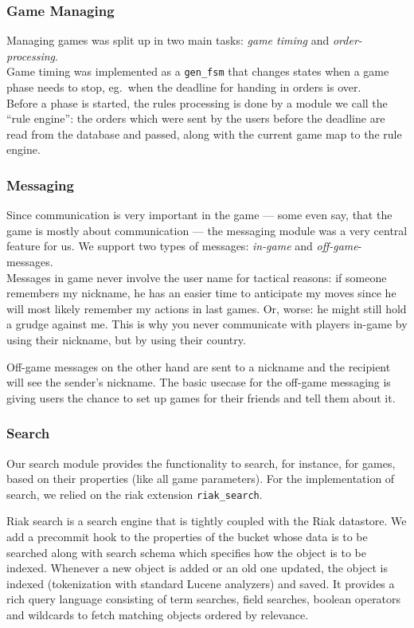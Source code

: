 \documentclass[11pt,a4paper]{report}
\begin{document}
\subsubsection{Game Managing}
Managing games was split up in two main tasks: {\em game timing\/} and
{\em order-processing}. \\
Game timing was implemented as a {\tt gen\_fsm} that changes states when a game
phase needs to stop, eg.\ when the deadline for handing in orders is over.\\
Before a phase is started, the rules processing is done by a module we call
the ``rule engine'': the orders which were sent by the users before the deadline
are read from the database and passed, along with the current game map to the
rule engine.
\subsubsection{Messaging}
Since communication is very important in the game --- some even say, that the
game is mostly about communication --- the messaging module was a very central
feature for us. We support two types of messages: {\em in-game\/} and
{\em off-game\/}-messages.\\
Messages in game never involve the user name for
tactical reasons: if someone remembers my nickname, he has an easier time to
anticipate my moves since he will most likely remember my actions in last games.
Or, worse: he might still hold a grudge against me. This is why you never
communicate with players in-game by using their nickname, but by using their
country.

Off-game messages on the other hand are sent to a nickname and the recipient
will see the sender's nickname. The basic usecase for the off-game messaging is
giving users the chance to set up games for their friends and tell them about
it.
\subsubsection{Search}
Our search module provides the functionality to search, for instance, for games,
based on their properties (like all game parameters). For the implementation of
search, we relied on the riak extension {\tt riak\_search}.

Riak search is a search engine that is tightly coupled with the Riak datastore.
We add a precommit hook to the properties of the bucket whose data is to be
searched along with search schema which specifies how the object is to be indexed.
Whenever a new object is added or an old one updated, the object is indexed
(tokenization with standard Lucene analyzers) and saved.
It provides a rich query language consisting of term searches, field searches,
boolean operators and wildcards to fetch matching objects ordered by relevance.
\end{document}
